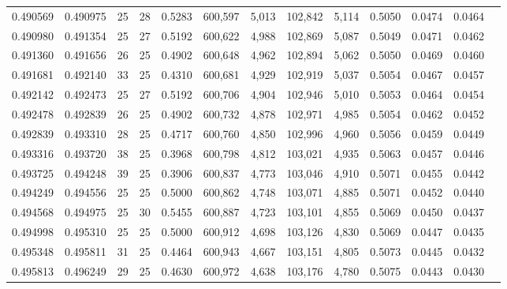 \begin{tabular}{rrrrrrrrrrrrr}
0.490569 & 0.490975 &    25 &  28 &                                     0.5283 & 600,597 &   5,013 & 102,842 &   5,114 & 0.5050 & 0.0474 & 0.0464 \\
0.490980 & 0.491354 &    25 &  27 &                                     0.5192 & 600,622 &   4,988 & 102,869 &   5,087 & 0.5049 & 0.0471 & 0.0462 \\
0.491360 & 0.491656 &    26 &  25 &                                     0.4902 & 600,648 &   4,962 & 102,894 &   5,062 & 0.5050 & 0.0469 & 0.0460 \\
0.491681 & 0.492140 &    33 &  25 &                                     0.4310 & 600,681 &   4,929 & 102,919 &   5,037 & 0.5054 & 0.0467 & 0.0457 \\
0.492142 & 0.492473 &    25 &  27 &                                     0.5192 & 600,706 &   4,904 & 102,946 &   5,010 & 0.5053 & 0.0464 & 0.0454 \\
0.492478 & 0.492839 &    26 &  25 &                                     0.4902 & 600,732 &   4,878 & 102,971 &   4,985 & 0.5054 & 0.0462 & 0.0452 \\
0.492839 & 0.493310 &    28 &  25 &                                     0.4717 & 600,760 &   4,850 & 102,996 &   4,960 & 0.5056 & 0.0459 & 0.0449 \\
0.493316 & 0.493720 &    38 &  25 &                                     0.3968 & 600,798 &   4,812 & 103,021 &   4,935 & 0.5063 & 0.0457 & 0.0446 \\
0.493725 & 0.494248 &    39 &  25 &                                     0.3906 & 600,837 &   4,773 & 103,046 &   4,910 & 0.5071 & 0.0455 & 0.0442 \\
0.494249 & 0.494556 &    25 &  25 &                                     0.5000 & 600,862 &   4,748 & 103,071 &   4,885 & 0.5071 & 0.0452 & 0.0440 \\
0.494568 & 0.494975 &    25 &  30 &                                     0.5455 & 600,887 &   4,723 & 103,101 &   4,855 & 0.5069 & 0.0450 & 0.0437 \\
0.494998 & 0.495310 &    25 &  25 &                                     0.5000 & 600,912 &   4,698 & 103,126 &   4,830 & 0.5069 & 0.0447 & 0.0435 \\
0.495348 & 0.495811 &    31 &  25 &                                     0.4464 & 600,943 &   4,667 & 103,151 &   4,805 & 0.5073 & 0.0445 & 0.0432 \\
0.495813 & 0.496249 &    29 &  25 &                                     0.4630 & 600,972 &   4,638 & 103,176 &   4,780 & 0.5075 & 0.0443 & 0.0430 \\

\end{tabular}
